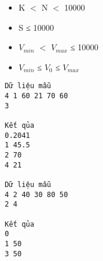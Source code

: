 \begin{itemize}
	\item     K $<$ N $<$ 10000   
	\item     S ≤ 10000   
	\item     $V_{min}$    $<$ $V_{max}$    ≤ 10000   
	\item     $V_{min}$    ≤ $V_{0}$    ≤ $V_{max}$
\end{itemize}
\begin{verbatim}
Dữ liệu mẫu
4 1 60 21 70 60
3

Kết qủa
0.2041
1 45.5
2 70
4 21

Dữ liệu mẫu
4 2 40 30 80 50
2 4

Kết qủa
0
1 50
3 50
\end{verbatim}